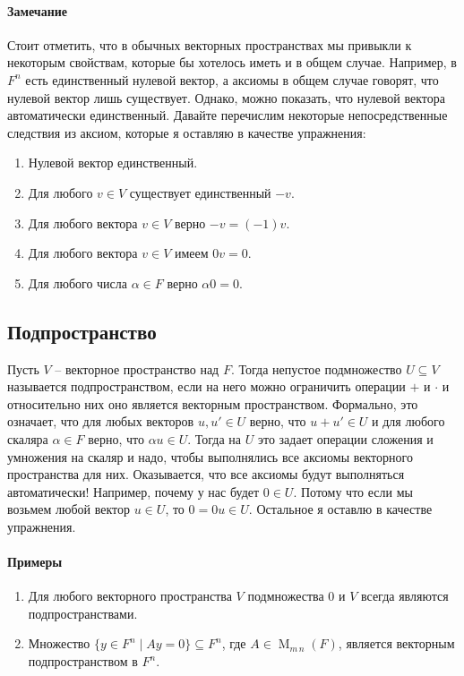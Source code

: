 \paragraph{Замечание}
Стоит отметить, что в обычных векторных пространствах мы привыкли к некоторым свойствам, которые бы хотелось иметь и в общем случае. Например, в $F^n$ есть единственный нулевой вектор, а аксиомы в общем случае говорят, что нулевой вектор лишь существует. Однако, можно показать, что нулевой вектора автоматически единственный. Давайте перечислим некоторые непосредственные следствия из аксиом, которые я оставляю в качестве упражнения:
\begin{enumerate}
\item Нулевой вектор единственный.

\item Для любого $v\in V$ существует единственный $-v$.

\item Для любого вектора $v\in V$ верно $-v = (-1)v$.

\item Для любого вектора $v\in V$ имеем $0 v = 0$.

\item Для любого числа $\alpha \in F$ верно $\alpha 0 = 0$.
\end{enumerate}

\subsection{Подпространство}

Пусть $V$ -- векторное пространство над $F$. Тогда непустое подмножество $U\subseteq V$ называется подпространством, если на него можно ограничить операции $+$ и $\cdot$ и относительно них оно является векторным пространством. Формально, это означает, что для любых векторов $u,u'\in U$ верно, что $u+u'\in U$ и для любого скаляра $\alpha\in F$ верно, что $\alpha u \in U$. Тогда на $U$ это задает операции сложения и умножения на скаляр и надо, чтобы выполнялись все аксиомы векторного пространства для них. Оказывается, что все аксиомы будут выполняться автоматически! Например, почему у нас будет $0\in U$. Потому что если мы возьмем любой вектор $u\in U$, то $0 = 0 u \in U$. Остальное я оставлю в качестве упражнения.  

\paragraph{Примеры}
\begin{enumerate}
\item Для любого векторного пространства $V$ подмножества $0$ и $V$ всегда являются подпространствами. 

\item Множество $\{y\in F^n \mid Ay = 0\}\subseteq F^n$, где $A\in\operatorname{M}_{m\,n}(F)$, является векторным подпространством в $F^n$.
\end{enumerate}

